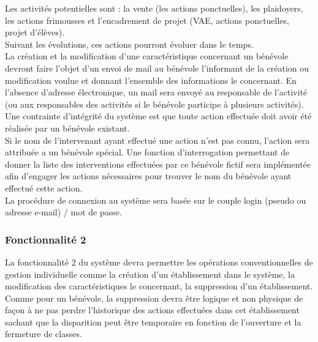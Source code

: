 Les activités potentielles sont : la vente (les actions ponctuelles), les plaidoyers, les actions frimousses et l'encadrement de projet (VAE, actions ponctuelles, projet d'élèves).\\
Suivant les évolutions, ces actions pourront évoluer dans le temps. \\ 


La création et la modification d'une caractéristique concernant un bénévole devront faire l'objet d'un envoi de mail au bénévole l'informant de la création ou modification voulue et donnant l'ensemble des informations le concernant. En l'absence d'adresse électronique, un mail sera envoyé au responsable de l'activité (ou aux responsables des activités si le bénévole participe à plusieurs activités).\\


Une contrainte d'intégrité du système est que toute action effectuée doit avoir été réalisée par un bénévole existant. \\
Si le nom de l'intervenant ayant effectué une action n'est pas connu, l'action sera attribuée a un bénévole spécial. Une fonction d'interrogation permettant de donner la liste des interventions effectuées par ce bénévole fictif sera implémentée afin d'engager les actions nécessaires pour trouver le nom du bénévole ayant effectué cette action. \\


La procédure de connexion au système sera basée sur le couple login (pseudo ou adresse e-mail) / mot de passe.
\\

\subsubsection{Fonctionnalité 2}
La fonctionnalité 2 du système devra permettre les opérations conventionnelles de gestion individuelle comme la création d'un établissement dans le système, la modification des
caractéristiques le concernant, la suppression d'un établissement. Comme pour un bénévole, la suppression devra être logique et non physique de façon à ne pas perdre l'historique des actions effectuées dans cet établissement sachant que la disparition peut être temporaire en fonction de l'ouverture et la fermeture de classes. \\


